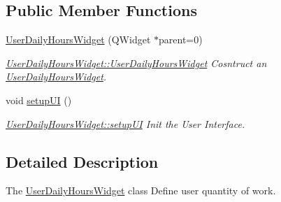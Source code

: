 \subsection*{Public Member Functions}
\begin{DoxyCompactItemize}
\item 
\hyperlink{classGui_1_1Widgets_1_1UserDailyHoursWidget_a63bfdbcafddbfccafcac0bf13d60b000}{User\-Daily\-Hours\-Widget} (Q\-Widget $\ast$parent=0)
\begin{DoxyCompactList}\small\item\em \hyperlink{classGui_1_1Widgets_1_1UserDailyHoursWidget_a63bfdbcafddbfccafcac0bf13d60b000}{User\-Daily\-Hours\-Widget\-::\-User\-Daily\-Hours\-Widget} Cosntruct an \hyperlink{classGui_1_1Widgets_1_1UserDailyHoursWidget}{User\-Daily\-Hours\-Widget}. \end{DoxyCompactList}\item 
\hypertarget{classGui_1_1Widgets_1_1UserDailyHoursWidget_a14ff53fb5878842117015890e61ac44d}{void \hyperlink{classGui_1_1Widgets_1_1UserDailyHoursWidget_a14ff53fb5878842117015890e61ac44d}{setup\-U\-I} ()}\label{classGui_1_1Widgets_1_1UserDailyHoursWidget_a14ff53fb5878842117015890e61ac44d}

\begin{DoxyCompactList}\small\item\em \hyperlink{classGui_1_1Widgets_1_1UserDailyHoursWidget_a14ff53fb5878842117015890e61ac44d}{User\-Daily\-Hours\-Widget\-::setup\-U\-I} Init the User Interface. \end{DoxyCompactList}\end{DoxyCompactItemize}


\subsection{Detailed Description}
The \hyperlink{classGui_1_1Widgets_1_1UserDailyHoursWidget}{User\-Daily\-Hours\-Widget} class Define user quantity of work. 

